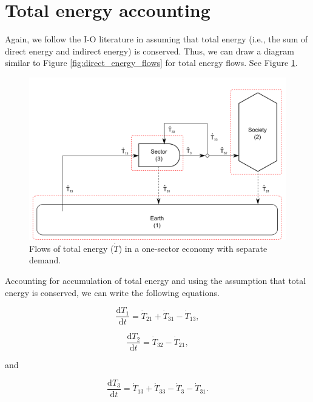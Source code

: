 \section{Total energy accounting}

Again, we follow the I-O literature in assuming that total energy (i.e., the sum of direct energy and indirect energy) is conserved. Thus, we can draw a diagram similar to Figure \ref{fig:direct_energy_flows} for total energy flows. See Figure \ref{fig:total_energy_flows_1S}.

\begin{figure}[h!]
\includegraphics[width=1.0\linewidth]{Chapter_Example_B/images/I-O_two_sector_total_energy.pdf}
\caption{Flows of total energy ($\dot{T}$) in a one-sector economy with separate demand.}
\label{fig:total_energy_flows_1S}
\end{figure}

Accounting for accumulation of total energy and using the assumption that total energy is conserved, we can write the following equations.

\begin{equation} \label{eq:CV_T_1}
	\frac{\mathrm{d}T_{1}}{\mathrm{d}t} 	 = \dot{T}_{21} + \dot{T}_{31} - \dot{T}_{13},
\end{equation}

\begin{equation} \label{eq:CV_T_2}
	\frac{\mathrm{d}T_{2}}{\mathrm{d}t} 	 = \dot{T}_{32} - \dot{T}_{21},
\end{equation}

\noindent and

\begin{equation} \label{eq:CV_T_3}
	\frac{\mathrm{d}T_{3}}{\mathrm{d}t} 	 = \dot{T}_{13} + \dot{T}_{33} - \dot{T}_{3} - \dot{T}_{31}.
\end{equation}

